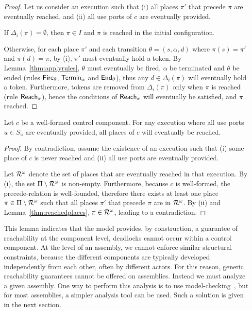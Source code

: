 {  \begin{proof}
    Let us consider an execution such that (i) all places $\pi'$ that
    precede $\pi$ are eventually reached, and (ii) all use ports of
    $c$ are eventually provided.

    If $\Delta_i(\pi) = \emptyset$, then $\pi \in I$ and $\pi$ is
    reached in the initial configuration.
    
    Otherwise, for each place $\pi'$ and each transition $\theta = (s,
    \alpha, d)$ where $\pi(s) = \pi'$ and $\pi(d) = \pi$, by (i),
    $\pi'$ must eventually hold a token. By
    Lemma~\ref{thm:applyrules}, $\theta$ must eventually be fired,
    $\alpha$ be terminated and $\theta$ be ended (rules $\mathsf{Fire}_\theta$,
    $\mathsf{Termin}_\alpha$ and $\mathsf{End}_\theta$), thus any $d \in \Delta_i(\pi)$
    will eventually hold a token. Furthermore, tokens are removed from
    $\Delta_i(\pi)$ only when $\pi$ is reached (rule $\mathsf{Reach}_\pi$),
    hence the conditions of $\mathsf{Reach}_\pi$ will eventually be
    satisfied, and $\pi$ reached.
  \end{proof}
  
  \begin{lemma}
    Let $c$ be a well-formed control component. For any execution where all
    use ports $u \in S_u$ are eventually provided, all places of $c$
    will eventually be reached.
  \end{lemma}

  \begin{proof}
    By contradiction, assume the existence of an execution such that
    (i) some place of $c$ is never reached and (ii) all use ports are
    eventually provided.

    Let $\mathcal{R}^\omega$ denote the set of places that are eventually
    reached in that execution. By (i), the set $\Pi \setminus
    \mathcal{R}^\omega$ is non-empty. Furthermore, because $c$ is
    well-formed, the precede-relation is well-founded, therefore there
    exists at least one place $\pi \in \Pi \setminus \mathcal{R}^\omega$
    such that all places $\pi'$ that precede $\pi$ are in
    $\mathcal{R}^\omega$. By (ii) and Lemma~\ref{thm:reachedplaces}, $\pi
    \in \mathcal{R}^\omega$, leading to a contradiction.
  \end{proof}

  This lemma indicates that the \mad model provides, by construction,
  a guarantee of reachability at the component level, \ie deadlocks
  cannot occur within a control component. At the level of an
  assembly, we cannot enforce similar structural constraints, because
  the different components are typically developed independently from
  each other, often by different actors. For this reason, generic
  reachability guarantees cannot be offered on assemblies. Instead we
  must analyze a given assembly. One way to perform this
  analysis is to use model-checking~\cite{coullon:hal-02323641}, but
  for most assemblies, a simpler analysis tool can be used. Such a
  solution is given in the next section.

}
